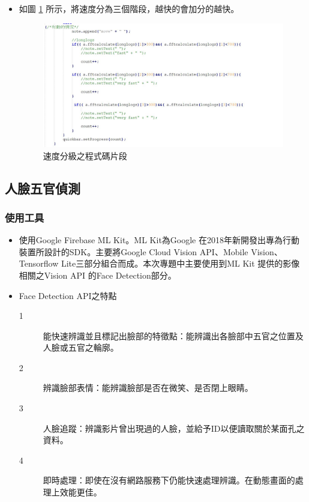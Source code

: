 \documentclass[12pt]{article}  %
\theoremstyle{plain}
\begin{document}
\begin{itemize}
\begin{itemize}
\item 如圖 \ref{速度分級之程式碼片段} 所示，將速度分為三個階段，越快的會加分的越快。
\begin{figure}[htbp]
\centering
\includegraphics[width=15cm]{pic/ch3/code-速度分級.JPG}
\caption{速度分級之程式碼片段} \label{速度分級之程式碼片段}
\end{figure}
\end{itemize}
\end{itemize}
\newpage

\subsection{人臉五官偵測}
\subsubsection{使用工具}
\begin{itemize}
\item 使用Google Firebase ML Kit。ML Kit為Google 在2018年新開發出專為行動裝置所設計的SDK。主要將Google Cloud Vision API、Mobile Vision、Tensorflow Lite三部分組合而成。本次專題中主要使用到ML Kit 提供的影像相關之Vision API 的Face Detection部分。
\item Face Detection API之特點
\begin{description}
\item[1] 能快速辨識並且標記出臉部的特徵點：能辨識出各臉部中五官之位置及人臉或五官之輪廓。
\item[2] 辨識臉部表情：能辨識臉部是否在微笑、是否閉上眼睛。
\item[3] 人臉追蹤：辨識影片曾出現過的人臉，並給予ID以便讀取關於某面孔之資料。
\item[4] 即時處理：即使在沒有網路服務下仍能快速處理辨識。在動態畫面的處理上效能更佳。
\end{description}
\end{itemize}
\end{document}
